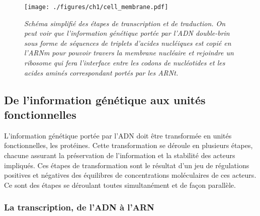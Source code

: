 \begin{figure}
  \centering
  {\texttt{[image: ./figures/ch1/cell\_membrane.pdf]}}
    \caption{\it Schéma simplifié des étapes de transcription et de traduction. On peut voir que l'information génétique portée par l'ADN double-brin sous forme de séquences de triplets d'acides nucléiques est copié en l'ARNm pour pouvoir travers la membrane nucléaire et rejoindre un ribosome qui fera l'interface entre les codons de nucléotides et les acides aminés correspondant portés par les ARNt.}
    \label{Fig:cell_membrane}
  \hspace{0.2cm}
\end{figure}


\subsection{De l'information génétique aux unités fonctionnelles} \label{trans_trad}

L'information génétique portée par l'ADN doit être transformée en unités fonctionnelles, les protéines. Cette transformation  se déroule en plusieurs étapes, chacune assurant la préservation de l'information et la stabilité des acteurs impliqués. Ces étapes de transformation sont le résultat d'un jeu de régulations positives et négatives des équilibres de concentrations moléculaires de ces acteurs. Ce sont des étapes se déroulant toutes simultanément et de façon parallèle.

\subsubsection{La transcription, de l'ADN à l'ARN}



